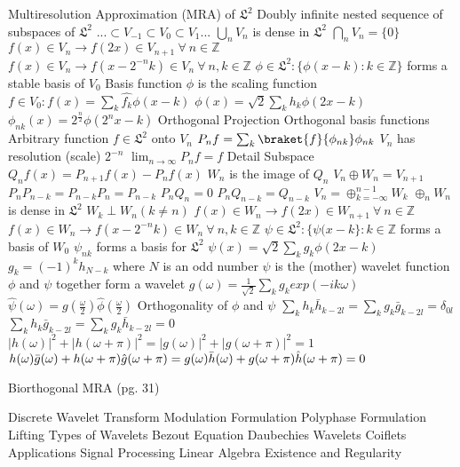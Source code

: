\documentclass[14pt]{extarticle}
\begin{document}
\begin{outline}
			\2	Multiresolution Approximation (MRA) of $\mathfrak{L}^2$
				\3	Doubly infinite nested sequence of subspaces of $\mathfrak{L}^2$
					\4	$... \subset V_{-1} \subset V_0 \subset V_1 ...$
				\3	$\bigcup_n V_n$ is dense in $\mathfrak{L}^2$
				\3	$\bigcap_n V_n = \{0\}$
				\3	$f(x) \in V_n \rightarrow f(2x) \in V_{n+1}~\forall~n\in \mathbb{Z}$
				\3	$f(x) \in V_n \rightarrow f(x - 2^{-n}k) \in V_n~\forall~n,k \in \mathbb{Z}$
				\3	$\phi \in \mathfrak{L}^2 : \{\phi(x - k) : k \in \mathbb{Z}\}$ forms a stable basis of $V_0$
				\3	Basis function $\phi$ is the scaling function
				\3	$f \in V_0 : f(x) = \sum_k \hat{f_k}\phi(x - k)$
				\3	$\phi(x) = \sqrt{2}\sum_k h_k \phi(2x - k)$
				\3	$\phi_{nk}(x) = 2^{\frac{n}{2}} \phi(2^nx - k)$
				\3	Orthogonal Projection 
					\4	Orthogonal basis functions
					\4	Arbitrary function $f \in \mathfrak{L}^2$ onto $V_n$
					\4	$P_nf = \sum_k \braket{f}{\phi_{nk}}\phi_{nk}$
					\4	$V_n$ has resolution (scale) $2^{-n}$
					\4	$\lim_{n \rightarrow \infty} P_nf = f$
				\3	Detail Subspace
					\4	$Q_nf(x) = P_{n+1}f(x) - P_nf(x)$
					\4	$W_n$ is the image of $Q_n$
					\4	$V_n \oplus W_n = V_{n+1}$
					\4	$P_nP_{n-k} = P_{n-k}P_n = P_{n-k}$
					\4	$P_nQ_n = 0$
					\4	$P_nQ_{n-k} = Q_{n-k}$
					\4	$V_n = \oplus_{k = -\infty}^{n-1} W_k$
					\4	$\oplus_nW_n$ is dense in $\mathfrak{L}^2$
					\4	$W_k \perp W_n (k \ne n)$
					\4	$f(x) \in W_n \rightarrow f(2x) \in W_{n+1}~\forall~n\in \mathbb{Z}$
					\4	$f(x) \in W_n \rightarrow f(x - 2^{-n}k) \in W_n~\forall~n,k \in \mathbb{Z}$
				\3	$\psi \in \mathfrak{L}^2 : \{\psi(x - k\} : k \in \mathbb{Z}$ forms a basis of $W_0$
				\3	$\psi_{nk}$ forms a basis for $\mathfrak{L}^2$
				\3	$\psi(x) = \sqrt{2} \sum_k g_k \phi(2x - k)$
				\3	$g_k = (-1)^kh_{N-k}$ where $N$ is an odd number
				\3	$\psi$ is the (mother) wavelet function
				\3	$\phi$ and $\psi$ together form a wavelet
				\3	$g(\omega) = \frac{1}{\sqrt{2}}\sum_k g_k exp(-ik\omega)$
				\3	$\hat{\psi}(\omega) = g(\frac{\omega}{2})\hat{\phi}(\frac{\omega}{2})$
				\3	Orthogonality of $\phi$ and $\psi$
					\4	$\sum_k h_k \bar{h}_{k-2l} = \sum_kg_k\bar{g}_{k-2l} = \delta_{0l}$
					\4	$\sum_k h_k \bar{g}_{k-2l} = \sum_kg_k\bar{h}_{k-2l} = 0$
					\4	$|h(\omega)|^2 + |h(\omega + \pi)|^2 = |g(\omega)|^2 + |g(\omega + \pi)|^2 = 1$
					\4	$h(\omega)\bar{g}(\omega) + h(\omega + \pi) \hat{g}(\omega + \pi) = \\ 
							 g(\omega)\bar{h}(\omega) + g(\omega + \pi) \hat{h}(\omega + \pi) = 0$
			
			\2	Biorthogonal MRA (pg. 31)

		\1	Discrete Wavelet Transform
			\2	Modulation Formulation
			\2	Polyphase Formulation
			\2	Lifting
		\1	Types of Wavelets
			\2	Bezout Equation
			\2	Daubechies Wavelets
			\2	Coiflets
		\1	Applications
			\2	Signal Processing
			\2	Linear Algebra
		\1	Existence and Regularity

	\end{outline}
\end{document}

